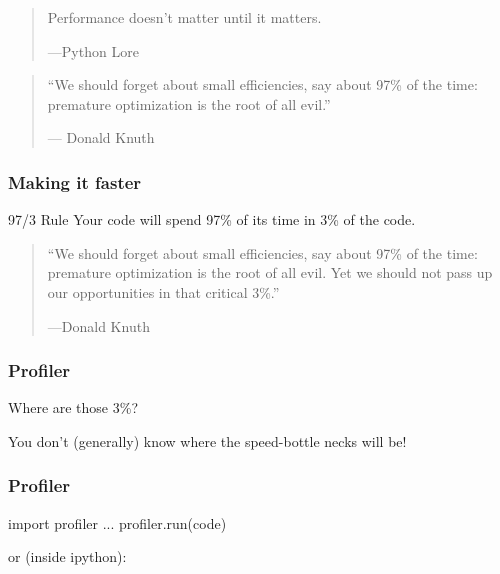 \begin{frame}[fragile]

\begin{quote}
Performance doesn't matter until it matters.

---Python Lore
\end{quote}

\end{frame}

\begin{frame}[fragile]

\begin{quote}
``We should forget about small efficiencies, say about 97\% of the time: premature optimization is the root of all evil.''

--- Donald Knuth
\end{quote}

\end{frame}

\begin{frame}[fragile]
\frametitle{Making it faster}
\begin{block}{97/3 Rule}
Your code will spend 97\% of its time in 3\% of the code.
\end{block}

\end{frame}

\begin{frame}[fragile]

\begin{quote}
``We should forget about small efficiencies, say about 97\% of the time: premature optimization is the root of all evil. Yet we should not pass up our opportunities in that critical 3\%.''

---Donald Knuth
\end{quote}

\end{frame}

\begin{frame}[fragile]
\frametitle{Profiler}
Where are those 3\%?
\bigskip
\pause

You don't (generally) know where the speed-bottle necks will be!
\end{frame}

\begin{frame}[fragile]
\frametitle{Profiler}

\begin{python}
import profiler
...
profiler.run(code)
\end{python}

\bigskip
or (inside \alert{ipython}):

\begin{python}
\end{python}
\end{frame}


